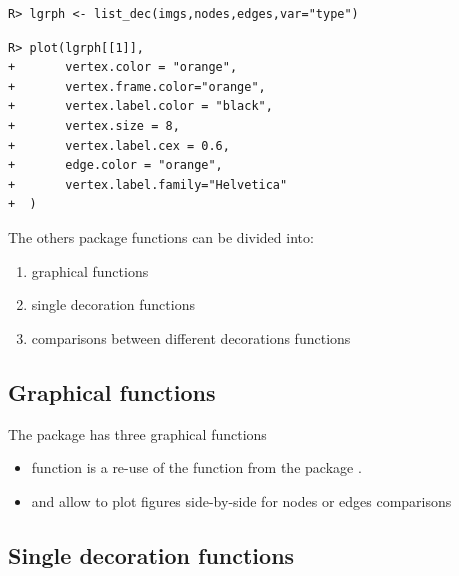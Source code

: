 \documentclass[article]{jss}\usepackage{knitr}
\begin{document}
\begin{kframe}
\begin{verbatim}
R> lgrph <- list_dec(imgs,nodes,edges,var="type")
\end{verbatim}


{\ttfamily\noindent\bfseries{}}\begin{verbatim}
R> plot(lgrph[[1]],
+       vertex.color = "orange",
+       vertex.frame.color="orange",
+       vertex.label.color = "black",
+       vertex.size = 8,
+       vertex.label.cex = 0.6,
+       edge.color = "orange",
+       vertex.label.family="Helvetica"
+  )
\end{verbatim}


{\ttfamily\noindent\bfseries{}}\end{kframe}


The others  package functions can be divided into:
\begin{enumerate}
 \item graphical functions
 \item single decoration functions
 \item comparisons between different decorations functions
\end{enumerate}

\subsection{Graphical functions} \label{sec:functions_gr}

The  package has three graphical functions
\begin{itemize}
\setlength\itemsep{.1em}
\item {} function is a re-use of the  function from the  package \citep{Snow20}.
\item {} and  allow to plot figures side-by-side for nodes or edges comparisons
\end{itemize}

\subsection{Single decoration functions} \label{sec:functions_one}
\end{document}
